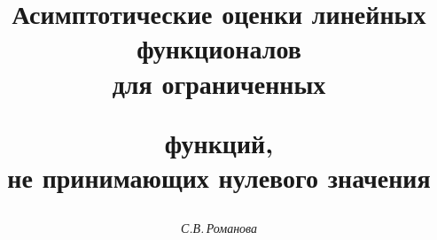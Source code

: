 

 


% 


 


\newcommand{\re}{\operatorname{Re}} 


\newcommand{\tts}[1]{} 


 




\setcounter{page}{83} 












 


\author{\it С.В.\,Романова} 




\title{Асимптотические оценки линейных функционалов\\ для ограниченных  


функций,\\ не принимающих нулевого значения} 


 


\date{} 




\pagestyle{plain} %


 




\maketitle 


